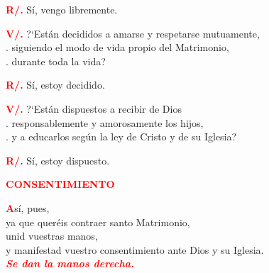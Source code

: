 \documentclass[12pt, letterpaper]{report}
\begin{document}
\Large \hspace{-0.9cm} {\bfseries \textcolor{red}{R/.}} \hspace{0.5cm} S\'i, vengo libremente. \newline

\Large \hspace{-0.9cm}  {\bfseries \textcolor{red}{V/.}} \hspace{0.5cm} ?`Est\'an decididos a amarse y respetarse mutuamente, \\
. \hspace{1cm} siguiendo el modo de vida propio del Matrimonio, \\
. \hspace{1cm} durante toda la vida? \newline

\Large \hspace{-0.9cm} {\bfseries \textcolor{red}{R/.}} \hspace{0.5cm} S\'i, estoy decidido. \newline

\Large \hspace{-0.9cm} {\bfseries \textcolor{red}{V/.}} \hspace{0.5cm} ?`Est\'an dispuestos a recibir de Dios \\
. \hspace{1cm} responsablemente y amorosamente los hijos, \\
. \hspace{1cm} y a educarlos seg\'un la ley de Cristo y de su Iglesia? \newline

\Large \hspace{-0.9cm} {\bfseries \textcolor{red}{R/.}} \hspace{0.5cm} S\'i, estoy dispuesto. \newline


\Large {\bfseries \textcolor{red}{CONSENTIMIENTO}}

\lettrine[lines=1]{\bfseries \textcolor{red}{A}}{}\Large s\'i, pues, \\
ya que quer\'eis contraer santo Matrimonio, \\
unid vuestras manos, \\
y manifestad vuestro consentimiento ante Dios y su Iglesia.\\

{\bfseries \textcolor{red}{ \em Se dan la manos derecha.}} \newline
\end{document}
